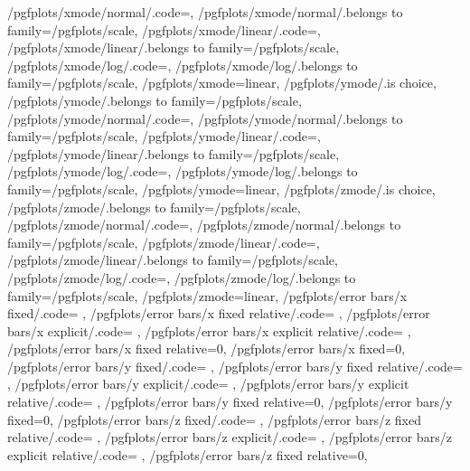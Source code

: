 {	/pgfplots/xmode/normal/.code={\pgfplots@xislineartrue},
	/pgfplots/xmode/normal/.belongs to family=/pgfplots/scale,
	/pgfplots/xmode/linear/.code={\pgfplots@xislineartrue},
	/pgfplots/xmode/linear/.belongs to family=/pgfplots/scale,
	/pgfplots/xmode/log/.code={\pgfplots@xislinearfalse},
	/pgfplots/xmode/log/.belongs to family=/pgfplots/scale,
	/pgfplots/xmode=linear,
	/pgfplots/ymode/.is choice,
	/pgfplots/ymode/.belongs to family=/pgfplots/scale,
	/pgfplots/ymode/normal/.code={\pgfplots@yislineartrue},
	/pgfplots/ymode/normal/.belongs to family=/pgfplots/scale,
	/pgfplots/ymode/linear/.code={\pgfplots@yislineartrue},
	/pgfplots/ymode/linear/.belongs to family=/pgfplots/scale,
	/pgfplots/ymode/log/.code={\pgfplots@yislinearfalse},
	/pgfplots/ymode/log/.belongs to family=/pgfplots/scale,
	/pgfplots/ymode=linear,
	/pgfplots/zmode/.is choice,
	/pgfplots/zmode/.belongs to family=/pgfplots/scale,
	/pgfplots/zmode/normal/.code={\pgfplots@zislineartrue},
	/pgfplots/zmode/normal/.belongs to family=/pgfplots/scale,
	/pgfplots/zmode/linear/.code={\pgfplots@zislineartrue},
	/pgfplots/zmode/linear/.belongs to family=/pgfplots/scale,
	/pgfplots/zmode/log/.code={\pgfplots@zislinearfalse},
	/pgfplots/zmode/log/.belongs to family=/pgfplots/scale,
	/pgfplots/zmode=linear,
	/pgfplots/error bars/x fixed/.code=				\def\pgfplots@errorbars@xfixed{#1}\def\pgfplots@errorbars@xmode{0},
	/pgfplots/error bars/x fixed relative/.code=		\def\pgfplots@errorbars@xrel{#1}\def\pgfplots@errorbars@xmode{1},
	/pgfplots/error bars/x explicit/.code=			\def\pgfplots@errorbars@xmode{2},
	/pgfplots/error bars/x explicit relative/.code=	\def\pgfplots@errorbars@xmode{3},
	/pgfplots/error bars/x fixed relative=0,
	/pgfplots/error bars/x fixed=0,
	/pgfplots/error bars/y fixed/.code=				\def\pgfplots@errorbars@yfixed{#1}\def\pgfplots@errorbars@ymode{0},
	/pgfplots/error bars/y fixed relative/.code=		\def\pgfplots@errorbars@yrel{#1}\def\pgfplots@errorbars@ymode{1},
	/pgfplots/error bars/y explicit/.code=			\def\pgfplots@errorbars@ymode{2},
	/pgfplots/error bars/y explicit relative/.code=	\def\pgfplots@errorbars@ymode{3},
	/pgfplots/error bars/y fixed relative=0,
	/pgfplots/error bars/y fixed=0,
	/pgfplots/error bars/z fixed/.code=				\def\pgfplots@errorbars@zfixed{#1}\def\pgfplots@errorbars@zmode{0},
	/pgfplots/error bars/z fixed relative/.code=		\def\pgfplots@errorbars@zrel{#1}\def\pgfplots@errorbars@zmode{1},
	/pgfplots/error bars/z explicit/.code=			\def\pgfplots@errorbars@zmode{2},
	/pgfplots/error bars/z explicit relative/.code=	\def\pgfplots@errorbars@zmode{3},
	/pgfplots/error bars/z fixed relative=0,
}

